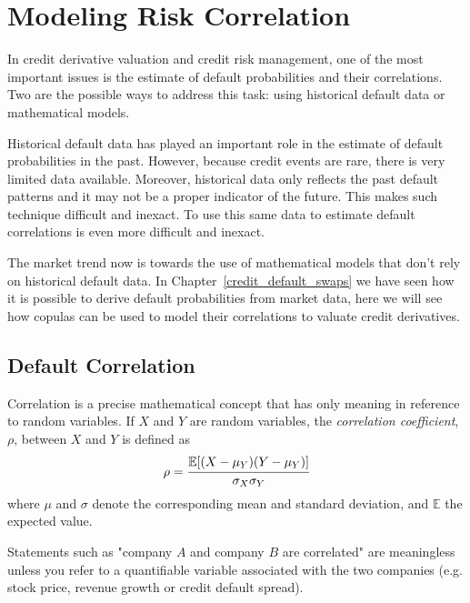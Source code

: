 \chapter{Modeling Risk Correlation}

In credit derivative valuation and credit risk management, one of the most important issues is the estimate of default probabilities and their correlations. Two are the possible ways to address this task: using historical default data or mathematical models.

Historical default data has played an important role in the estimate of default probabilities in the past. However, because credit events are rare, there is very limited data available. Moreover, historical data only reflects the past default patterns and it may not be a proper indicator of the future. This makes such technique difficult and inexact. To use this same data to estimate default correlations is even more difficult and inexact.

The market trend now is towards the use of mathematical models that don't rely on historical default data. In Chapter~\ref{credit_default_swaps} we have seen how it is possible to derive default probabilities from market data, here we will see how copulas can be used to model their correlations to valuate credit derivatives. 

\section{Default Correlation}
\label{sec:default_correlation}
Correlation is a precise mathematical concept that has only meaning in reference to random variables. If $X$ and $Y$ are random variables, the \emph{correlation coefficient}, $\rho$, between $X$ and $Y$ is defined as
\begin{equation}
\rho = \cfrac{\mathbb{E}[(X-\mu_Y)(Y-\mu_Y)]}{\sigma_X \sigma_Y}
\label{eq:correlation_coefficient}
\end{equation}
where $\mu$ and $\sigma$ denote the corresponding mean and standard deviation, and $\mathbb{E}$ the expected value.

Statements such as "company $A$ and company $B$ are correlated" are meaningless unless you refer to a quantifiable variable associated with the two companies (e.g. stock price, revenue growth or credit default spread).

